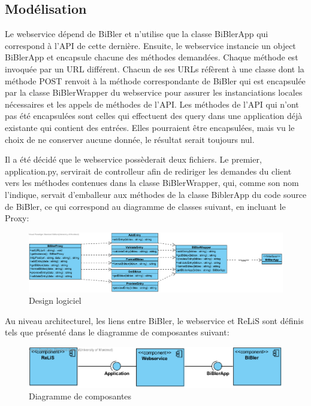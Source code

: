 \documentclass[12pt,titlepage]{article}
\begin{document}
\subsection{Modélisation}
Le webservice dépend de BiBler et n'utilise que la classe BiBlerApp qui correspond à l'API de cette dernière. Ensuite, le webservice instancie un object BiBlerApp et encapsule chacune des méthodes demandées. Chaque méthode est invoquée par un URL différent. Chacun de ses URLs réfèrent à une classe dont la méthode POST renvoit à la méthode correspondante de BiBler qui est encapsulée par la classe BiBlerWrapper du webservice pour assurer les instanciations locales nécessaires et les appels de méthodes de l'API. Les méthodes de l'API qui n'ont pas été encapsulées sont celles qui effectuent des query dans une application déjà existante qui contient des entrées. Elles pourraient être encapsulées, mais vu le choix de ne conserver aucune donnée, le résultat serait toujours nul. \newline

Il a été décidé que le webservice possèderait deux fichiers. Le premier, application.py, servirait de controlleur afin de rediriger les demandes du client vers les méthodes contenues dans la classe BiBlerWrapper, qui, comme son nom l'indique, servait d'emballeur aux méthodes de la classe BiblerApp du code source de BiBler, ce qui correspond au diagramme de classes suivant, en incluant le Proxy:


\begin{figure}[h!]
\caption{Design logiciel}
\includegraphics[width=\textwidth,height=\textheight,keepaspectratio]{ClassDiagram.png}
\end{figure}

Au niveau architecturel, les liens entre BiBler, le webservice et ReLiS sont définis tels que présenté dans le diagramme de composantes suivant:


\begin{figure}[h!]
\caption{Diagramme de composantes}
\includegraphics{ComponentDiagram.png}
\end{figure}
\end{document}
